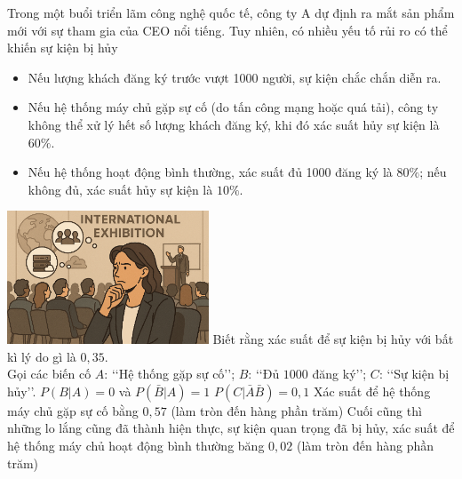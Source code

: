 \begin{ex}%
\immini
{
    Trong một buổi triển lãm công nghệ quốc tế, công ty A dự định ra mắt sản phẩm mới với sự tham gia của CEO nổi tiếng. Tuy nhiên, có nhiều yếu tố rủi ro có thể khiến sự kiện bị hủy
\begin{itemize}
 \item Nếu lượng khách đăng ký trước vượt 1000 người, sự kiện chắc chắn diễn ra.
 \item Nếu hệ thống máy chủ gặp sự cố (do tấn công mạng hoặc quá tải), công ty không thể xử lý hết số lượng khách đăng ký, khi đó xác suất hủy sự kiện là $60\%$.
 \item Nếu hệ thống hoạt động bình thường, xác suất đủ 1000 đăng ký là $80\%$; nếu không đủ, xác suất hủy sự kiện là $10\%$.
\end{itemize}
}
{
\includegraphics[width=6cm]{img/HXN-13-16}
}
Biết rằng xác suất để sự kiện bị hủy với bất kì lý do gì là $0{,}35$.\\
Gọi các biến cố $A$: \lq\lq Hệ thống gặp sự cố\rq\rq; $B$: \lq\lq Đủ $1000$ đăng ký\rq\rq; $C$: \lq\lq Sự kiện bị hủy\rq\rq.
\choiceTF
 {\True $ P\left(B|A\right)=0$ và $ P\left(\bar{B}|A\right)=1$}
 {\True $ P\left(C|\bar{A}\bar{B}\right)=0{,}1$}
 {Xác suất để hệ thống máy chủ gặp sự cố bằng $0{,}57$ (làm tròn đến hàng phần trăm)}
 {\True Cuối cũng thì những lo lắng cũng đã thành hiện thực, sự kiện quan trọng đã bị hủy, xác suất để hệ thống máy chủ hoạt động bình thường băng $0{,}02$ (làm tròn đến hàng phần trăm)}
\end{ex}
